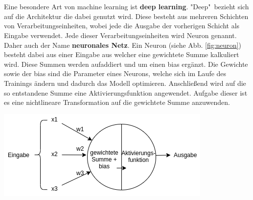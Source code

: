\documentclass[
    12pt, %
    DIV10,
    ngerman, %
    a4paper, %
    oneside, %
    titlepage, %
    parskip=half, %
    headings=normal, %
    listof=totoc, %
    bibliography=totoc, %
    index=totoc, %
    captions=tableheading, %
    final %
]{scrreprt}
\begin{document}
\\\\
Eine besondere Art von machine learning ist \textbf{deep learning}. "Deep"\ bezieht sich auf die Architektur die dabei genutzt wird. Diese besteht aus mehreren Schichten von Verarbeitungseinheiten, wobei jede die Ausgabe der vorherigen Schicht als Eingabe verwendet. Jede dieser Verarbeitungseinheiten wird Neuron genannt. Daher auch der Name \textbf{neuronales Netz}. Ein Neuron (siehe Abb. \ref{fig:neuron}) besteht dabei aus einer Eingabe aus welcher eine gewichtete Summe kalkuliert wird. Diese Summen werden aufaddiert und um einen bias ergänzt. Die Gewichte sowie der bias sind die Parameter eines Neurons, welche sich im Laufe des Trainings ändern und dadurch das Modell optimieren. Anschließend wird auf die so entstandene Summe eine Aktivierungsfunktion angewendet. Aufgabe dieser ist es eine nichtlineare Transformation auf die gewichtete Summe anzuwenden.
\begin{center}
\includegraphics[scale=0.6]{img/neuron.png}
\label{fig:neuron}
\end{center}
\end{document}
